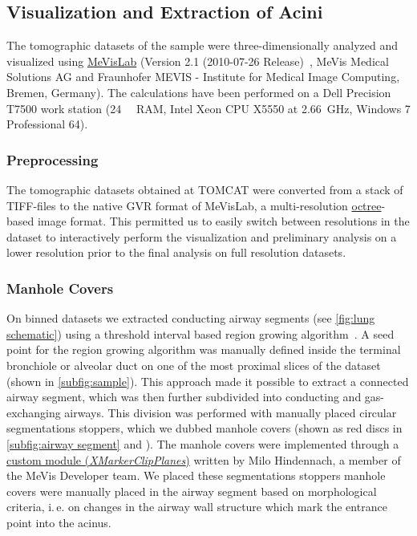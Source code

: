 \documentclass[%
	paper=a4,%
	abstract=true,%
	]{scrartcl}
\newcommand{\ie}{i.\,e.\xspace}
\begin{document}
\subsection{Visualization and Extraction of Acini}
The tomographic datasets of the sample were three-dimensionally analyzed and visualized using \href{http://mevislab.de}{MeVisLab} (Version 2.1 (2010-07-26 Release)~\cite{Bitter2007}, MeVis Medical Solutions AG and Fraunhofer MEVIS - Institute for Medical Image Computing, Bremen, Germany). The calculations have been performed on a Dell Precision T7500 work station (\SI{24}{\giga\byte} RAM, Intel Xeon CPU X5550 at \SI{2.66}{\giga\hertz}, Windows 7 Professional \SI{64}{\bit}).

\subsubsection{Preprocessing}
The tomographic datasets obtained at TOMCAT were converted from a stack of TIFF-files to the native GVR format of MeVisLab, a multi-resolution \href{https://secure.wikimedia.org/wikipedia/en/w/index.php?title=Octree&oldid=409131920}{octree}-based image format. This permitted us to easily switch between resolutions in the dataset to interactively perform the visualization and preliminary analysis on a lower resolution prior to the final analysis on full resolution datasets.

\subsubsection{Manhole Covers\label{sec:manholecovers}}
On binned datasets we extracted conducting airway segments (see \autoref{fig:lung schematic}) using a threshold interval based region growing algorithm~\cite{Zucker1976}. A seed point for the region growing algorithm was manually defined inside the terminal bronchiole or alveolar duct on one of the most proximal slices of the dataset (shown in \autoref{subfig:sample}). This approach made it possible to extract a connected airway segment, which was then further subdivided into conducting and gas-exchanging airways. This division was performed with manually placed circular segmentations stoppers, which we dubbed manhole covers (shown as red discs in \autoref{subfig:airway segment} and ). The manhole covers were implemented through a \href{http://www.mevis-research.de/cgi-bin/discus/board-auth.cgi?lm=1282233250&file=/839/11760.html}{custom module (\emph{XMarkerClipPlanes})} written by Milo Hindennach, a member of the MeVis Developer team. We placed these segmentations stoppers manhole covers were manually placed in the airway segment based on morphological criteria, \ie on changes in the airway wall structure which mark the entrance point into the acinus.
\end{document}
